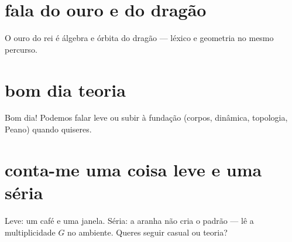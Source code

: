 \documentclass[11pt,a4paper]{article}
\begin{document}
\section{fala do ouro e do dragão}
O ouro do rei é álgebra e órbita do dragão --- léxico e geometria no mesmo percurso.

\section{bom dia teoria}
Bom dia! Podemos falar leve ou subir à fundação (corpos, dinâmica, topologia, Peano)
quando quiseres.

\section{conta-me uma coisa leve e uma séria}
Leve: um café e uma janela. Séria: a aranha não cria o padrão --- lê a multiplicidade $G$
no ambiente. Queres seguir casual ou teoria?
\end{document}
